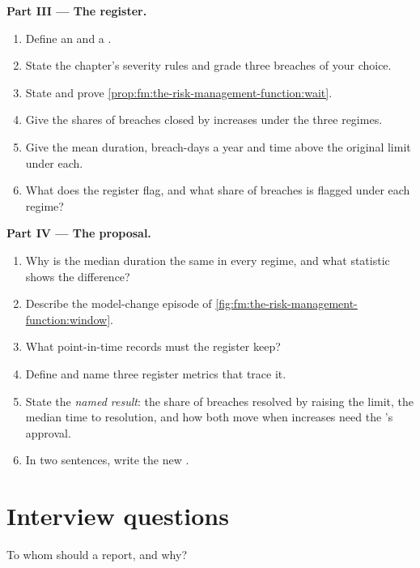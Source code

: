 \begin{problem}
\medskip\noindent\textbf{Part III --- The register.}
\begin{enumerate}[resume]
\item Define an  and a .
\item State the chapter's severity rules and grade three breaches of your choice.
\item State and prove \cref{prop:fm:the-risk-management-function:wait}.
\item Give the shares of breaches closed by increases under the three regimes.
\item Give the mean duration, breach-days a year and time above the original limit under each.
\item What does the register flag, and what share of breaches is flagged under each regime?
\end{enumerate}

\medskip\noindent\textbf{Part IV --- The proposal.}
\begin{enumerate}[resume]
\item Why is the median duration the same in every regime, and what statistic shows the difference?
\item Describe the model-change episode of \cref{fig:fm:the-risk-management-function:window}.
\item What point-in-time records must the register keep?
\item Define  and name three register metrics that trace it.
\item State the \emph{named result}: the share of breaches resolved by raising the limit, the median time to resolution, and how both move when
increases need the 's approval.
\item In two sentences, write the new .
\end{enumerate}
\end{problem}

\section{Interview questions}

\begin{interviewq}\label{iq:fm:the-risk-management-function:1}
To whom should a  report, and why?
\end{interviewq}

